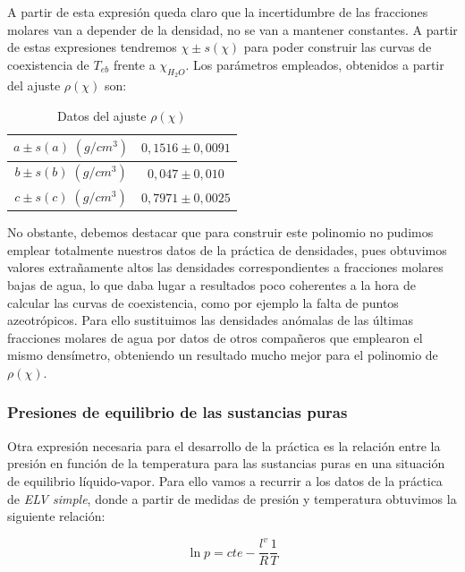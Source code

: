 \documentclass[a4paper,12pt,titlepage]{article}
\begin{document}
A partir de esta expresión queda claro que la incertidumbre de las fracciones molares van a depender de la densidad, no se van a mantener constantes. A partir de estas expresiones tendremos $\chi \pm s(\chi)$ para poder construir las curvas de coexistencia de $T_{eb}$ frente a  $\chi_{H_2O}$. Los parámetros empleados, obtenidos a partir del ajuste $\rho(\chi)$ son:

\begin{table}[h!]
    \centering
    \begin{tabular}{|c|c|}
    \hline
    $a \pm s(a) \;(g/cm^3)$ & $0,1516 \pm 0,0091$ \\ \hline
    $b\pm s(b) \; (g/cm^3)$ &  $0,047 \pm 0,010$\\ \hline
    $c \pm s(c) \; (g/cm^3)$ & $0,7971 \pm 0,0025$\\ \hline
    \end{tabular}
    \caption{Datos del ajuste $\rho(\chi)$}
    \label{tab:my_label}
\end{table}

No obstante, debemos destacar que para construir este polinomio no pudimos emplear totalmente nuestros datos de la práctica de densidades, pues obtuvimos valores extrañamente altos las densidades correspondientes a fracciones molares bajas de agua, lo que daba lugar a resultados poco coherentes a la hora de calcular las curvas de coexistencia, como por ejemplo la falta de puntos azeotrópicos. Para ello sustituimos las densidades anómalas de las últimas fracciones molares de agua por datos de otros compañeros que emplearon el mismo densímetro, obteniendo un resultado mucho mejor para el polinomio de $\rho(\chi)$.

\subsubsection{Presiones de equilibrio de las sustancias puras}

Otra expresión necesaria para el desarrollo de la práctica es la relación entre la presión en función de la temperatura para las sustancias puras en una situación de equilibrio líquido-vapor. Para ello vamos a recurrir a los datos de la práctica de \textit{ELV simple}, donde a partir de medidas de presión y temperatura obtuvimos la siguiente relación:

\begin{equation}
    \ln p = cte - \frac{l^v}{R}\frac{1}{T}
    \label{ln p}
\end{equation}
\end{document}
